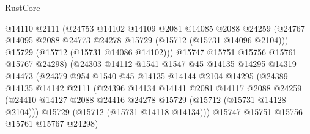 \begin{lexlean}{RustCore}
\begin{coremodule}
                            @14110
                            @2111
                            (@24753
                              @14102
                              @14109
                              @2081
                              @14085
                              @2088
                              @24259
                              (@24767
                                @14095
                                @2088
                                @24773
                                @24278
                                @15729
                                (@15712 (@15731 @14096 @2104)))
                              @15729
                              (@15712 (@15731 @14086 @14102)))
                            @15747
                            @15751
                            @15756
                            @15761
                            @15767
                            @24298)
                          (@24303
                            @14112
                            @1541
                            @1547
                            @45
                            @14135
                            @14295
                            @14319
                            @14473
                            (@24379
                              @954
                              @1540
                              @45
                              @14135
                              @14144
                              @2104
                              @14295
                              (@24389
                                @14135
                                @14142
                                @2111
                                (@24396
                                  @14134
                                  @14141
                                  @2081
                                  @14117
                                  @2088
                                  @24259
                                  (@24410
                                    @14127
                                    @2088
                                    @24416
                                    @24278
                                    @15729
                                    (@15712 (@15731 @14128 @2104)))
                                  @15729
                                  (@15712 (@15731 @14118 @14134)))
                                @15747
                                @15751
                                @15756
                                @15761
                                @15767
                                @24298)

\end{coremodule}
\end{lexlean}
